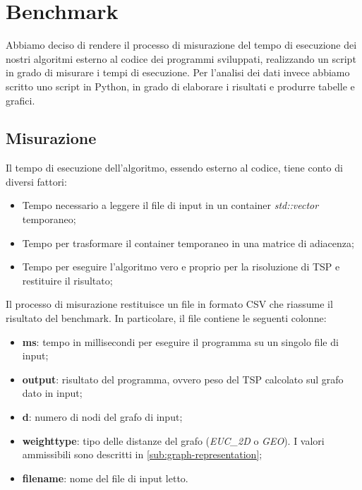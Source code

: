 \section{Benchmark}
\label{cap:benchmark-process}

Abbiamo deciso di rendere il processo di misurazione del tempo di
esecuzione dei nostri algoritmi esterno al codice dei programmi
sviluppati, realizzando un script in grado di misurare i tempi di
esecuzione. Per l'analisi dei dati invece abbiamo scritto uno script
in Python, in grado di elaborare i risultati e produrre tabelle e
grafici.

\subsection{Misurazione}

Il tempo di esecuzione dell'algoritmo, essendo esterno al codice,
tiene conto di diversi fattori:

\begin{itemize}
    \item Tempo necessario a leggere il file di input in un container
      \textit{std::vector} temporaneo;
    \item Tempo per trasformare il container temporaneo in una matrice
      di adiacenza;
    \item Tempo per eseguire l'algoritmo vero e proprio per la
      risoluzione di TSP e restituire il risultato;
\end{itemize}

\noindent Il processo di misurazione restituisce un file in formato
CSV che riassume il risultato del benchmark. In particolare, il file
contiene le seguenti colonne:

\begin{itemize}
    \item \textbf{ms}: tempo in millisecondi per eseguire il programma
      su un singolo file di input;
    \item \textbf{output}: risultato del programma, ovvero peso
      del TSP calcolato sul grafo dato in input;
    \item \textbf{d}: numero di nodi del grafo di input;
    \item \textbf{weight\textunderscore type}: tipo delle distanze del
      grafo (\textit{EUC\_2D} o \textit{GEO}). I valori ammissibili sono descritti in \ref{sub:graph-representation};
    \item \textbf{filename}: nome del file di input letto.
\end{itemize}

